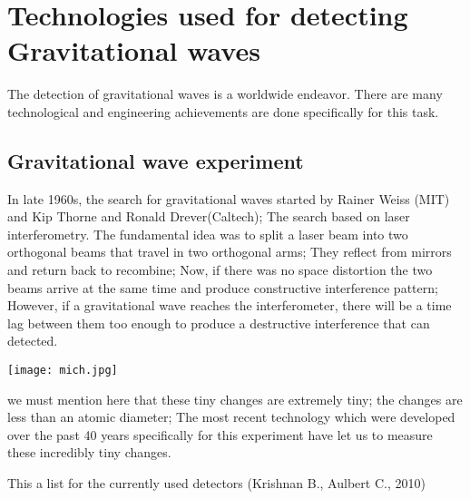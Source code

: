 \documentclass[11]{article}
\begin{document}
\vspace{5mm}
\section{Technologies used for detecting Gravitational waves}
The detection of gravitational waves is a worldwide endeavor. 
There are many technological and engineering achievements are done specifically for this task.

\subsection{Gravitational wave experiment}

In late 1960s, the search for gravitational waves started by Rainer Weiss (MIT) and Kip Thorne and Ronald Drever(Caltech); The search based on laser interferometry. The fundamental idea was to split a laser beam into two orthogonal beams that travel in two orthogonal arms; They reflect from mirrors and return back to recombine; Now, if there was no space distortion the two beams arrive at the same time and produce constructive interference pattern; However, if a gravitational wave reaches the interferometer, there will be a time lag between them too enough to produce a destructive interference that can detected.
\begin{center}
\texttt{[image: mich.jpg]}
\end{center}
we must mention here that these tiny changes are extremely tiny; the changes are less than an atomic diameter; The most recent technology which were developed over the past 40 years specifically for this experiment have let us to measure these incredibly tiny changes.

 \newpage
This a list for the currently used detectors (Krishnan B., Aulbert C., 2010)
\end{document}
